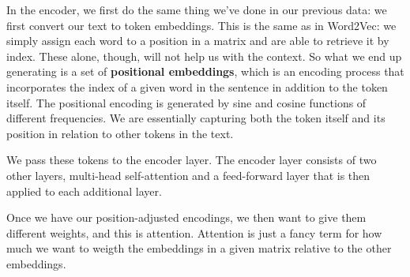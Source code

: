 \documentclass[draft, 11pt]{diazessay} %
\begin{document}

In the encoder, we first do the same thing we've done in our previous data: we first convert our text to token embeddings. This is the same as in Word2Vec: we simply assign each word to a position in a matrix and are able to retrieve it by index. These alone, though, will not help us with the context. So what we end up generating is a set of \textbf{positional embeddings}, which is an encoding process that incorporates the index of a given word in the sentence in addition to the token itself. The positional encoding is generated by sine and cosine functions of different frequencies. We are essentially capturing both the token itself and its position in relation to other tokens in the text. 

We pass these tokens to the encoder layer. The encoder layer consists of two other layers, multi-head self-attention and a feed-forward layer that is then applied to each additional layer. 

Once we have our position-adjusted encodings, we then want to give them different weights, and this is attention. Attention is just a fancy term for how much we want to weigth the embeddings in a given matrix relative to the other embeddings. 
\end{document}
